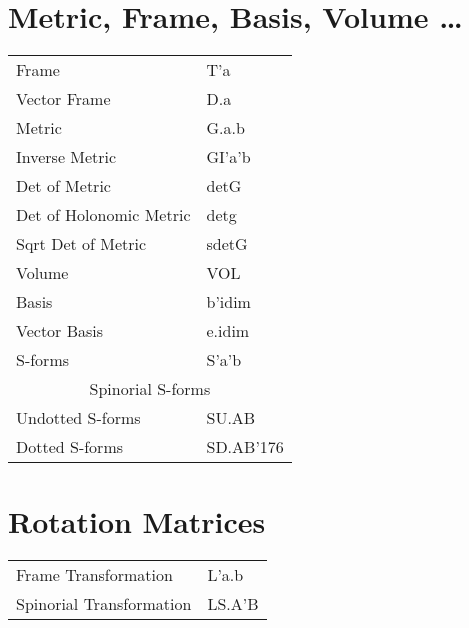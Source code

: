 \documentclass[twoside,openright]{report}
\newcommand{\grgtt}{\ttfamily}
\renewcommand{\tt}{\grgtt}
\newcommand{\cc}{{\tt \char'176}}           %
\begin{document}
\begin{center}


\section{Metric, Frame, Basis, Volume \dots}
\begin{tabular}{|l|l|}\hline
\tt    Frame                   &\tt   T'a\\
\tt    Vector Frame            &\tt   D.a\\
\hline
\tt    Metric                  &\tt   G.a.b\\
\tt    Inverse Metric          &\tt   GI'a'b\\
\tt    Det of Metric           &\tt   detG\\
\tt    Det of Holonomic Metric &\tt   detg\\
\tt    Sqrt Det of Metric      &\tt   sdetG\\
\hline
\tt    Volume                  &\tt   VOL\\
\hline
\tt    Basis                   &\tt   b'idim \\
\tt    Vector Basis            &\tt   e.idim \\
\hline
\tt    S-forms                 &\tt   S'a'b\\
\hline
\multicolumn{2}{|c|}{\tt Spinorial S-forms} \\
\tt    Undotted S-forms   &\tt    SU.AB\\
\tt    Dotted S-forms     &\tt    SD.AB\cc\\
\hline\end{tabular}

\section{Rotation Matrices}
\begin{tabular}{|l|l|}\hline
\tt    Frame Transformation      &\tt   L'a.b \\
\tt    Spinorial Transformation  &\tt   LS.A'B \\
\hline\end{tabular}


\end{center}
\end{document}
